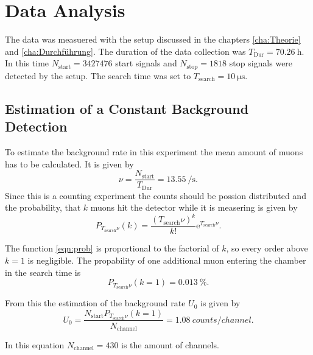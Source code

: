 \chapter{Data Analysis}
\label{cha:Auswertung}
The data was measuered with the setup discussed in the chapters \ref{cha:Theorie} and \ref{cha:Durchführung}. The duration of the data collection was $T_\mathrm{Dur} = \qty{70.26}{\hour}$. In this 
time $N_{\mathrm{start}} = \num{3427476}$ start signals and $N_{\mathrm{stop}} = \num{1818}$ stop signals were detected by the setup. The search time was set to 
$T_\mathrm{search} = \qty{10}{\micro\second}$.

\section{Estimation of a Constant Background Detection}
\label{sec:background}

To estimate the background rate in this experiment the mean amount of muons has to be calculated. It is given by 
\begin{equation}
    \label{eqn:muon_amount}
    \nu = \frac{N_\mathrm{start}}{T_\mathrm{Dur}} = \qty{13.55}{\per\second} .
\end{equation}
Since this is a counting experiment the counts should be possion distributed and the probability, that $k$ muons hit the detector while it is measering is given by
\begin{equation}
    \label{eqn:prob}
    P_{T_\mathrm{search}\nu}(k) = \frac{(T_\mathrm{search}\nu)^k}{k!}\mathrm{e}^{T_\mathrm{search}\nu} .
\end{equation}

The function \ref{eqn:prob} is proportional to the factorial of $k$, so every order above $k=1$ is negligible. The propability of one additional muon entering the chamber in the 
search time is 
\begin{equation*}
    P_{T_\mathrm{search}\nu}(k=1) = \qty{0.013}{\percent} .
\end{equation*}

From this the estimation of the background rate $U_0$ is given by 
\begin{equation}
    \label{eqn:background}
    U_0 = \frac{N_\mathrm{start}P_{T_\mathrm{search}\nu}(k=1)}{N_\mathrm{channel}} = \qty{1.08}{counts\per channel} .
\end{equation}

In this equation $N_\mathrm{channel} = 430$ is the amount of channels.

